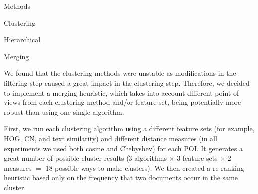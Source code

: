 \documentclass{acm_proc_article-me}
\begin{document}
\begin{section}{Methods}
\begin{subsection}{Clustering}
\begin{subsubsection}{Hierarchical}
\end{subsubsection}

\begin{subsubsection}{Merging}

We found that the clustering methods were unstable as modifications in the filtering step caused a great impact in the clustering step.
Therefore, we decided to implement a merging heuristic, which takes into account different point of views from each clustering method and/or feature set,
being potentially more robust than using one single algorithm.

First, we run each clustering algorithm using a different feature sets (for example, HOG, CN, and text similarity) and different distance measures (in all experiments we used both cosine and Chebyshev) for each POI. It generates a great number of possible cluster results (3 algorithms $\times$ 3 feature sets $\times$ 2 measures $=$ 18 possible ways to make clusters). 
We then created a re-ranking heuristic based only on the frequency that two documents occur in the same cluster.


\end{subsubsection}
\end{subsection}
\end{section}
\end{document}
